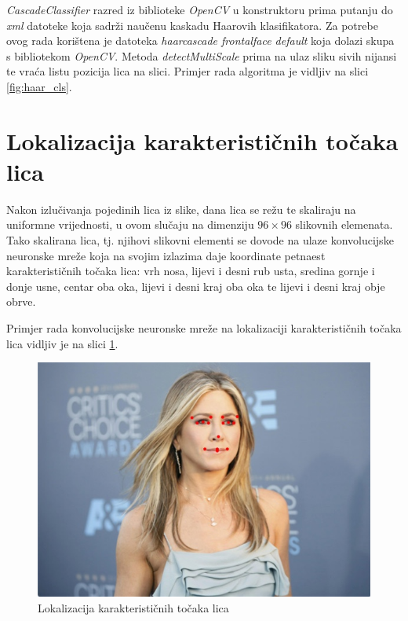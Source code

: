 \documentclass[times, utf8, zavrsni, numeric]{fer}
\begin{document}
\emph{CascadeClassifier} razred iz biblioteke \emph{OpenCV} u konstruktoru prima putanju do \emph{xml} datoteke koja sadrži naučenu kaskadu Haarovih klasifikatora. Za potrebe ovog rada korištena je datoteka \emph{haarcascade frontalface default} koja dolazi skupa s bibliotekom \emph{OpenCV}. Metoda \emph{detectMultiScale} prima na ulaz sliku sivih nijansi te vraća listu pozicija lica na slici. Primjer rada algoritma je vidljiv na slici \ref{fig:haar_cls}.

\section{Lokalizacija karakterističnih točaka lica}

Nakon izlučivanja pojedinih lica iz slike, dana lica se režu te skaliraju na uniformne vrijednosti, u ovom slučaju na dimenziju $96 \times 96$ slikovnih elemenata. Tako skalirana lica, tj. njihovi slikovni elementi se dovode na ulaze konvolucijske neuronske mreže koja na svojim izlazima daje koordinate petnaest karakterističnih točaka lica: vrh nosa, lijevi i desni rub usta, sredina gornje i donje usne, centar oba oka, lijevi i desni kraj oba oka te lijevi i desni kraj obje obrve.

Primjer rada konvolucijske neuronske mreže na lokalizaciji karakterističnih točaka lica vidljiv je na slici \ref{fig:lkt}.

\begin{figure}[htb]
    \centering
    \includegraphics[width=13cm]{images/jennifer_good.jpg}
    \caption{Lokalizacija karakterističnih točaka lica}
    \label{fig:lkt}
\end{figure}
\end{document}
